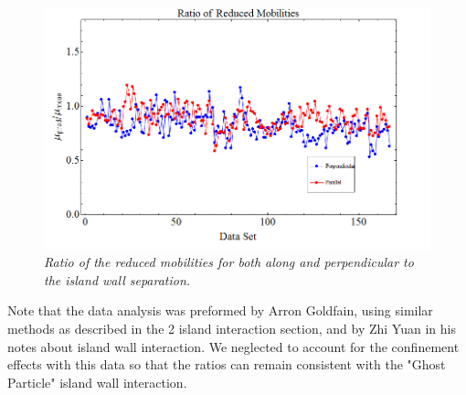 \documentclass[11pt]{article}
\begin{document}
\begin{figure}
\centering
\includegraphics[scale=0.4]{Images/IslandWallRedMobRatio.png}
\caption{\textit{Ratio of the reduced mobilities for both along and perpendicular to the island wall separation.}}
\label{IslandWallRatio}
\end{figure}

Note that the data analysis was preformed by Arron Goldfain, using similar methods as described in the 2 island interaction section, and by Zhi Yuan in his notes about island wall interaction. We neglected to account for the confinement effects with this data so that the ratios can remain consistent with the "Ghost Particle" island wall interaction.
\end{document}
